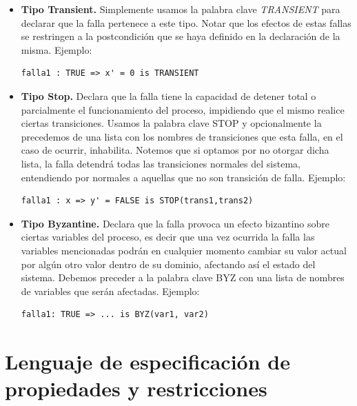 \documentclass[titlepage, 12pt]{book}
\begin{document}
\begin{itemize}
\item \textbf{Tipo Transient.} Simplemente usamos la palabra clave \textit{TRANSIENT} para declarar que la falla pertenece a este tipo. Notar que los efectos de estas fallas se restringen a la postcondici\'on que se haya definido en la declaraci\'on de la misma. Ejemplo: \begin{verbatim}falla1 : TRUE => x' = 0 is TRANSIENT\end{verbatim}
\item \textbf{Tipo Stop.} Declara que la falla tiene la capacidad de detener total o parcialmente el funcionamiento del proceso, impidiendo que el mismo realice ciertas transiciones. Usamos la palabra clave STOP y opcionalmente la precedemos de una lista con los nombres de transiciones que esta falla, en el caso de ocurrir, inhabilita. Notemos que si optamos por no otorgar dicha lista, la falla detendr\'a todas las transiciones normales del sistema, entendiendo por normales a aquellas que no son transici\'on de falla. Ejemplo: \begin{verbatim}falla1 : x => y' = FALSE is STOP(trans1,trans2) \end{verbatim}
\item \textbf{Tipo Byzantine.} Declara que la falla provoca un efecto bizantino sobre ciertas variables del proceso, es decir que una vez ocurrida la falla las variables mencionadas podr\'an en cualquier momento cambiar su valor actual por alg\'un otro valor dentro de su dominio, afectando as\'i el estado del sistema. Debemos preceder a la palabra clave BYZ con una lista de nombres de variables que ser\'an afectadas. Ejemplo: \begin{verbatim}falla1: TRUE => ... is BYZ(var1, var2) \end{verbatim}
\end{itemize}

\section{Lenguaje de especificaci\'on de propiedades y restricciones}
\end{document}
